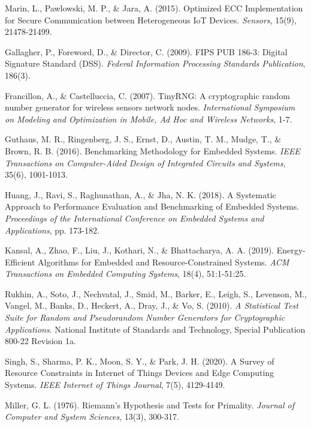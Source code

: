 \begin{thebibliography}{99}
 Marin, L., Pawlowski, M. P., \& Jara, A. (2015). Optimized ECC Implementation for Secure Communication between Heterogeneous IoT Devices. \textit{Sensors}, 15(9), 21478-21499.

 Gallagher, P., Foreword, D., \& Director, C. (2009). FIPS PUB 186-3: Digital Signature Standard (DSS). \textit{Federal Information Processing Standards Publication}, 186(3).

 Francillon, A., \& Castelluccia, C. (2007). TinyRNG: A cryptographic random number generator for wireless sensors network nodes. \textit{International Symposium on Modeling and Optimization in Mobile, Ad Hoc and Wireless Networks}, 1-7.

 Guthaus, M. R., Ringenberg, J. S., Ernst, D., Austin, T. M., Mudge, T., \& Brown, R. B. (2016). Benchmarking Methodology for Embedded Systems. \textit{IEEE Transactions on Computer-Aided Design of Integrated Circuits and Systems}, 35(6), 1001-1013.

 Huang, J., Ravi, S., Raghunathan, A., \& Jha, N. K. (2018). A Systematic Approach to Performance Evaluation and Benchmarking of Embedded Systems. \textit{Proceedings of the International Conference on Embedded Systems and Applications}, pp. 173-182.

 Kansal, A., Zhao, F., Liu, J., Kothari, N., \& Bhattacharya, A. A. (2019). Energy-Efficient Algorithms for Embedded and Resource-Constrained Systems. \textit{ACM Transactions on Embedded Computing Systems}, 18(4), 51:1-51:25.

 Rukhin, A., Soto, J., Nechvatal, J., Smid, M., Barker, E., Leigh, S., Levenson, M., Vangel, M., Banks, D., Heckert, A., Dray, J., \& Vo, S. (2010). \textit{A Statistical Test Suite for Random and Pseudorandom Number Generators for Cryptographic Applications}. National Institute of Standards and Technology, Special Publication 800-22 Revision 1a.

 Singh, S., Sharma, P. K., Moon, S. Y., \& Park, J. H. (2020). A Survey of Resource Constraints in Internet of Things Devices and Edge Computing Systems. \textit{IEEE Internet of Things Journal}, 7(5), 4129-4149.

 Miller, G. L. (1976). Riemann's Hypothesis and Tests for Primality. \textit{Journal of Computer and System Sciences}, 13(3), 300-317.


\end{thebibliography}
